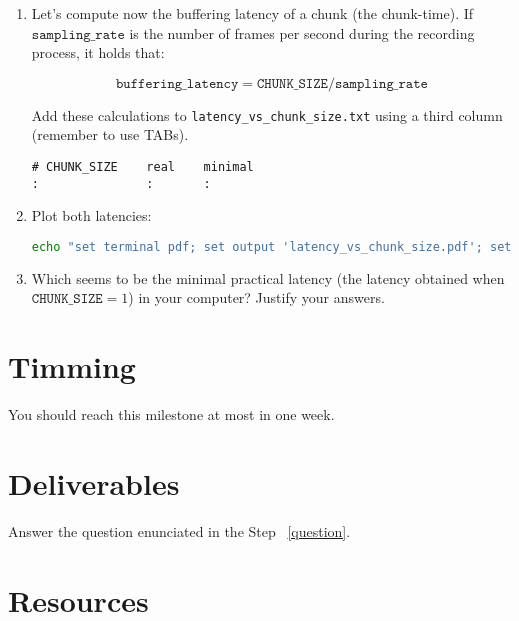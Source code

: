 \begin{enumerate}
  \begin{lstlisting}[language=Bash]
     sudo apt install gnuplot
     echo "set terminal pdf; set output 'latency_vs_chunk_size.pdf'; set xlabel 'CHUNK\_SIZE (frames)'; set ylabel 'Latency (seconds)'; plot 'latency_vs_chunk_size.txt' title '' with linespoints" | gnuplot
  \end{lstlisting}

\item Let's compute now the buffering latency of a chunk (the
  chunk-time). If $\mathtt{sampling\_rate}$ is the number of frames
  per second during the recording process, it holds that:
  
  \begin{equation}
    \mathtt{buffering\_latency} = \mathtt{CHUNK\_SIZE} / \mathtt{sampling\_rate}
  \end{equation}

  Add these calculations to \texttt{latency\_vs\_chunk\_size.txt} using
  a third column (remember to use TABs).
\begin{verbatim}
# CHUNK_SIZE    real    minimal
:               :       :
\end{verbatim}

\item Plot both latencies:

  \begin{lstlisting}[language=Bash]
    echo "set terminal pdf; set output 'latency_vs_chunk_size.pdf'; set xlabel 'CHUNK\_SIZE (frames)'; set ylabel 'Latency (seconds)'; set key left; plot 'latency_vs_chunk_size.txt' using 1:2 title 'Real' with linespoints, 'latency_vs_chunk_size.txt' using 1:3 title 'Minimal' with linespoints" | gnuplot
  \end{lstlisting}
  
\item Which seems to be the minimal practical latency (the latency obtained
  when $\mathtt{CHUNK\_SIZE}=1$) in your computer? Justify your
  answers. \label{question}

\end{enumerate}

\section{Timming}

You should reach this milestone at most in one week.

\section{Deliverables}

Answer the question enunciated in the Step ~\ref{question}.

\section{Resources}


